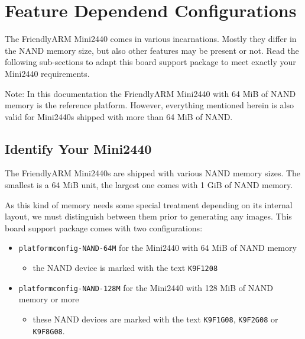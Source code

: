 %
%
%
%
%
%
%

\section{Feature Dependend Configurations}	\label{sec:featuremini2440}

The FriendlyARM Mini2440 comes in various incarnations. Mostly they differ in
the NAND memory size, but also other features may be present or not. Read the
following sub-sections to adapt this board support package to meet exactly
your Mini2440 requirements.

Note: In this documentation the FriendlyARM Mini2440 with 64 MiB of NAND
memory is the reference platform. However, everything mentioned herein is also
valid for Mini2440s shipped with more than 64 MiB of NAND.

\subsection{Identify Your Mini2440}		\label{sec:identifymini2440}

The FriendlyARM Mini2440s are shipped with various NAND memory sizes. The
smallest is a 64 MiB unit, the largest one comes with 1 GiB of NAND memory.

As this kind of memory needs some special treatment depending on its internal
layout, we must distinguish between them prior to generating any images. This board
support package comes with two configurations:

\begin{itemize}
 \item \texttt{platformconfig-NAND-64M} for the Mini2440 with 64 MiB of NAND
   memory
  \begin{itemize}
   \item the NAND device is marked with the text \texttt{K9F1208}
  \end{itemize}
 \item \texttt{platformconfig-NAND-128M} for the Mini2440 with
  128 MiB of NAND memory or more
  \begin{itemize}
    \item these NAND devices are marked with the text \texttt{K9F1G08},
   \texttt{K9F2G08} or \texttt{K9F8G08}.
  \end{itemize}
\end{itemize}

